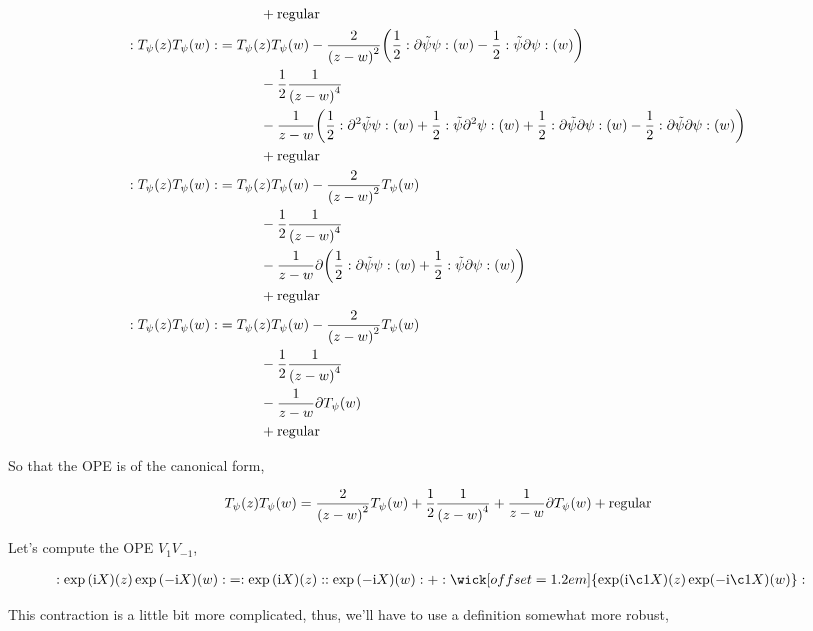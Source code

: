 \begin{align*}
    &\quad\quad\quad+\textnormal{regular}\\
    :T_\psi\qty(z)T_\psi\qty(w):&=T_\psi\qty(z)T_\psi\qty(w)-\frac{2}{\qty(z-w)^2}\qty(\frac12:\partial\tilde\psi\psi:\qty(w)-\frac12:\tilde\psi\partial\psi:\qty(w))\\
    &\quad\quad\quad-\frac12\frac{1}{\qty(z-w)^4}\\
    &\quad\quad\quad-\frac{1}{z-w}\qty(\frac12:\partial^2\tilde\psi\psi:\qty(w)+\frac12:\tilde\psi\partial^2\psi:\qty(w)+\frac12:\partial\tilde\psi\partial\psi:\qty(w)-\frac12:\partial\tilde\psi\partial\psi:\qty(w))\\
    &\quad\quad\quad+\textnormal{regular}\\
    :T_\psi\qty(z)T_\psi\qty(w):&=T_\psi\qty(z)T_\psi\qty(w)-\frac{2}{\qty(z-w)^2}T_\psi\qty(w)\\
    &\quad\quad\quad-\frac12\frac{1}{\qty(z-w)^4}\\
    &\quad\quad\quad-\frac{1}{z-w}\partial\qty(\frac12:\partial\tilde\psi\psi:\qty(w)+\frac12:\tilde\psi\partial\psi:\qty(w))\\
    &\quad\quad\quad+\textnormal{regular}\\
    :T_\psi\qty(z)T_\psi\qty(w):&=T_\psi\qty(z)T_\psi\qty(w)-\frac{2}{\qty(z-w)^2}T_\psi\qty(w)\\
    &\quad\quad\quad-\frac12\frac{1}{\qty(z-w)^4}\\
    &\quad\quad\quad-\frac{1}{z-w}\partial T_\psi\qty(w)\\
    &\quad\quad\quad+\textnormal{regular}
\end{align*}

So that the OPE is of the canonical form,

\begin{align*}
    T_\psi\qty(z)T_\psi\qty(w)=\frac{2}{\qty(z-w)^2}T_\psi\qty(w)+\frac12\frac{1}{\qty(z-w)^4}+\frac{1}{z-w}\partial T_\psi\qty(w)+\textnormal{regular}
\end{align*}

\probitem{}
\label{4d}
Let's compute the OPE $V_1V_{-1}$,

\begin{align*}
    \cnord{\exp\qty(\im X)\qty(z)\exp\qty(-\im X)\qty(w)}&=\cnord{\exp\qty(\im X)\qty(z)}\cnord{\exp\qty(-\im X)\qty(w)}+\cnord{\wick[offset=1.2em]{\textnormal{exp}(\im \c1{X})\qty(z)\exp(-\im \c1{X})\qty(w)}}
\end{align*}

This contraction is a little bit more complicated, thus, we'll have to use a definition somewhat more robust,

